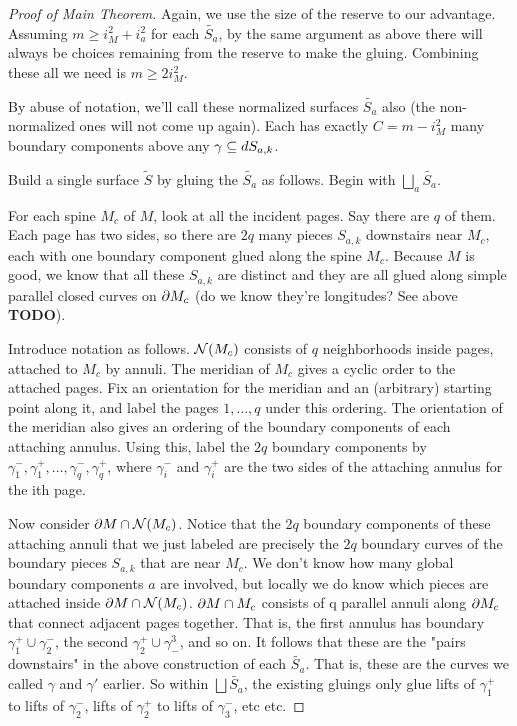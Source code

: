 \begin{proof}[Proof of Main Theorem]
Again, we use the size of the reserve to our advantage. Assuming $m\geq i_M^2
+ i_a^2$ for each $\widetilde{S_a}$, by the same argument as above there will
always be choices remaining from the reserve to make the gluing. Combining
these all we need is $m\geq 2i_M^2$.

By abuse of notation, we'll call these normalized surfaces $\widetilde{S_a}$ also (the
non-normalized ones will not come up again). Each has exactly $C = m - i_M^2$
many boundary components above any $\gamma \subseteq dS_{a,k}$.

Build a single surface $\widetilde{S}$ by gluing the $\widetilde{S_a}$ as follows. Begin with
$\bigsqcup_a \widetilde{S_a}$.

For each spine $M_c$ of $M$, look at all the incident pages. Say there are $q$
of them.  Each page has two sides, so there are $2q$ many pieces $S_{a,k}$
downstairs near $M_c$, each with one boundary component glued along the spine
$M_c$.  Because $M$ is good, we know that all these $S_{a,k}$ are distinct and
they are all glued along simple parallel closed curves on $\partial M_c$ (do we know
they're longitudes?  See above \textbf{ TODO}).

Introduce notation as follows. $\mathcal{N}(M_c)$ consists of $q$ neighborhoods inside
pages, attached to $M_c$ by annuli. The meridian of $M_c$ gives a cyclic order to
the attached pages.  Fix an orientation for the meridian and an (arbitrary)
starting point along it, and label the pages $1, \dots, q$ under this ordering.
The orientation of the meridian also gives an ordering of the boundary
components of each attaching annulus.  Using this, label the $2q$ boundary
components by $\gamma_1^-,\gamma_1^+,\dots, \gamma_q^-,\gamma_q^+$, where
$\gamma_i^-$ and $\gamma_i^+$ are the two sides of the attaching annulus for
the ith page.

Now consider $\partial M \cap \mathcal{N}(M_c)$. Notice that the $2q$ boundary components of these
attaching annuli that we just labeled are precisely the $2q$ boundary curves of
the boundary pieces $S_{a,k}$ that are near $M_c$. We don't know how many global
boundary components $a$ are involved, but locally we do know which pieces are
attached inside $\partial M \cap \mathcal{N}(M_c)$. $\partial M \cap M_c$ consists of q parallel annuli
along $\partial M_c$ that connect adjacent pages together. That is, the first annulus
has boundary $\gamma_1^+ \cup \gamma_2^-$, the second $\gamma_2^+ \cup
\gamma^3_-$, and so on.  It follows that these are the "pairs downstairs" in
the above construction of each $\widetilde{S_a}$. That is, these are the curves
we called $\gamma$ and $\gamma'$ earlier.  So within $\bigsqcup \widetilde{S_a}$,
the existing gluings only glue lifts of $\gamma_1^+$ to lifts of $\gamma_2^-$,
lifts of $\gamma_2^+$ to lifts of $\gamma_3^-$, etc etc.


\end{proof}
